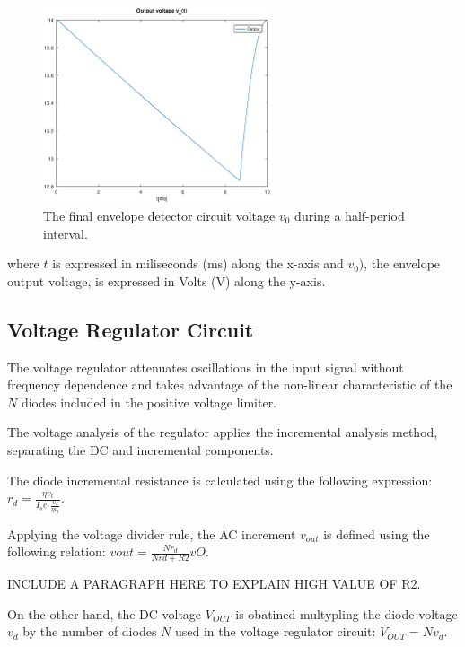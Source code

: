 \begin{figure}[H] \centering
\includegraphics[width=0.6\textwidth]{envelope.eps}
\caption{The final envelope detector circuit voltage $v_0$ during a half-period interval.}
\label{fig:envelope}
\end{figure}

where $t$ is expressed in miliseconds (ms) along the x-axis and 
$v_0)$, the envelope output voltage, is expressed in Volts (V) along the y-axis.

\subsection{Voltage Regulator Circuit}
\label{subsec:regulator}

The voltage regulator attenuates oscillations in the input signal without frequency dependence and takes advantage of the non-linear characteristic of the $N$ diodes included in the positive voltage limiter. 

The voltage analysis of the regulator applies the incremental analysis method, separating the DC and incremental components.

The diode incremental resistance is calculated using the following expression: $r_d=\frac{\eta v_t}{I_s e^(\frac{v_d}{\eta v_t}}$.

Applying the voltage divider rule, the AC increment $v_{out}$ is defined using the following relation: $vout=\frac{N r_d}{N rd+R2}vO$.

INCLUDE A PARAGRAPH HERE TO EXPLAIN HIGH VALUE OF R2.

On the other hand, the DC voltage $V_{OUT}$ is obatined multypling the diode voltage $v_d$ by the number of diodes $N$ used in the voltage regulator circuit: $V_{OUT}=N v_d$.

